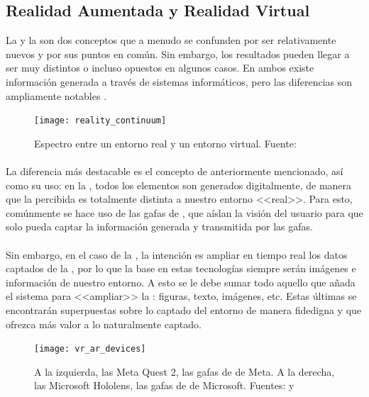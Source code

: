 \documentclass{subfiles}
\begin{document}
        \subsection[Realidad Aumentada y Realidad Virtual]{Realidad Aumentada y Realidad Virtual}
        \label{sec:realidad_aumentada_y_realidad_virtual}

        La \ra y la \rv son dos conceptos que a menudo se confunden por ser relativamente nuevos y por sus puntos en común. Sin embargo, los resultados pueden llegar a ser muy distintos o incluso opuestos en algunos casos. En ambos existe información generada a través de sistemas informáticos, pero las diferencias son ampliamente notables \cite{web:diferencias_ra_rv}.

        \begin{figure}[H]
        \centering
        \texttt{[image: reality\_continuum]}
        \caption{Espectro entre un entorno real y un entorno virtual. Fuente: }
        \label{fig:reality_continuum}
        \end{figure}

        \paragraph{}
        La diferencia más destacable es el concepto de \realidad anteriormente mencionado, así como su uso: en la \rv, todos los elementos son generados digitalmente, de manera que la \realidad percibida es totalmente distinta a nuestro entorno <<real>>. Para esto, comúnmente se hace uso de las gafas de \rv, que aíslan la visión del usuario para que solo pueda captar la información generada y transmitida por las gafas.
    
        \paragraph{}
        Sin embargo, en el caso de la \ra, la intención es ampliar en tiempo real los datos captados de la \realidad, por lo que la base en estas tecnologías siempre serán imágenes e información de nuestro entorno. A esto se le debe sumar todo aquello que añada el sistema para <<ampliar>> la \realidad: figuras, texto, imágenes, etc. Estas últimas se encontrarán superpuestas sobre lo captado del entorno de manera fidedigna y que ofrezca más valor a lo naturalmente captado.

        \begin{figure}
        \centering
        \texttt{[image: vr\_ar\_devices]}
        \caption{A la izquierda, las Meta Quest 2, las gafas de \rv de Meta. A la derecha, las Microsoft Hololens, las gafas de \ra de Microsoft. Fuentes:  y }
        \label{fig:vr_ar_devices}
        \end{figure}
    
\end{document}
